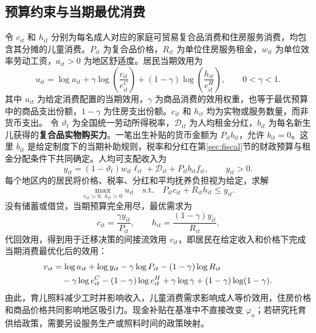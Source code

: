 \documentclass[UTF8,a4paper,zihao=-4,fontset=windows]{ctexart}
\numberwithin{equation}{section}
\begin{document}
\subsection{预算约束与当期最优消费}
令 $c_{it}$ 和 $h_{it}$ 分别为每名成人对应的家庭可贸易复合品消费和住房服务消费，均包含其分摊的儿童消费。$P_{it}$ 为复合品价格，$R_{it}$ 为单位住房服务租金，$w_{it}$ 为单位效率劳动工资，$a_{it}>0$ 为地区舒适度。居民当期效用为
\begin{equation}
  u_{it}=\log a_{it}
   +\gamma\log\!\left(\frac{c_{it}}{e^C_{it}}\right)
   +(1-\gamma)\log\!\left(\frac{h_{it}}{e^H_{it}}\right),
  \qquad 0<\gamma<1.
  \label{eq:flow-utility}
\end{equation}
其中 $u_{it}$ 为给定消费配置的当期效用，$\gamma$ 为商品消费的效用权重，也等于最优预算中的商品支出份额，$1-\gamma$ 为住房支出份额。$c_{it}$ 和 $h_{it}$ 均为实物或服务数量，而非货币支出。
令 $\vartheta_t$ 为全国统一劳动所得税率，$\mathcal D_{it}$ 为人均租金分红，$b_{it}$ 为每名新生儿获得的\textbf{复合品实物购买力}。一笔出生补贴的货币金额为 $P_{it}b_{it}$，允许 $b_{it}=0$。这里 $b_{it}$ 是给定制度下的当期补助规则，税率和分红在第\ref{sec:fiscal}节的财政预算与租金分配条件下共同确定。人均可支配收入为
\begin{equation}
  y_{it}=(1-\vartheta_t)w_{it}\ell_{it}
     +\mathcal D_{it}+P_{it}b_{it}f_{it},\qquad y_{it}>0.
  \label{eq:disposable-income}
\end{equation}
每个地区内的居民将价格、税率、分红和平均抚养负担视为给定，求解
\begin{equation}
  \max_{c_{it}>0,\ h_{it}>0} u_{it}
  \quad\text{s.t.}\quad
  P_{it}c_{it}+R_{it}h_{it}\leq y_{it}.
  \label{eq:household-problem}
\end{equation}
没有储蓄或借贷，当期预算完全用尽，最优需求为
\begin{equation}
  c_{it}=\frac{\gamma y_{it}}{P_{it}},\qquad
  h_{it}=\frac{(1-\gamma)y_{it}}{R_{it}}.
  \label{eq:household-demands}
\end{equation}
代回效用，得到用于迁移决策的间接流效用 $v_{it}$，即居民在给定收入和价格下完成当期消费最优化后的效用：
\begin{align}
  v_{it}
  &=\log a_{it}+\log y_{it}
    -\gamma\log P_{it}-(1-\gamma)\log R_{it}\notag\\
  &\quad-\gamma\log e^C_{it}-(1-\gamma)\log e^H_{it}
    +\gamma\log\gamma+(1-\gamma)\log(1-\gamma).
  \label{eq:indirect-utility}
\end{align}
由此，育儿照料减少工时并影响收入，儿童消费需求影响成人等价效用，住房价格和商品价格共同影响地区吸引力。现金补贴在基准中不直接改变 $\varphi_a$；若研究托育供给政策，需要另设服务生产或照料时间的政策映射。
\end{document}
